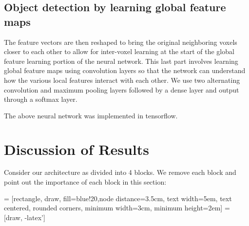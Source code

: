 \documentclass{article}
\begin{document}
\subsection{Object detection by learning global feature maps}
The feature vectors are then reshaped to bring the original neighboring voxels closer to each other to allow for inter-voxel learning at the start of the global feature learning portion of the neural network. This last part involves learning global feature maps using convolution layers so that the network can understand how the various local features interact with each other. We use two alternating convolution and maximum pooling layers followed by a dense layer and output through a softmax layer. 

The above neural network was implemented in tensorflow.

\section{Discussion of Results}
Consider our architecture as divided into 4 blocks. We remove each block and point out the importance of each block in this section:

 = [rectangle, draw, fill=blue!20,node distance=3.5cm, 
text width=5em, text centered, rounded corners, minimum width=3cm, minimum height=2em]
 = [draw, -latex']

\end{document}
